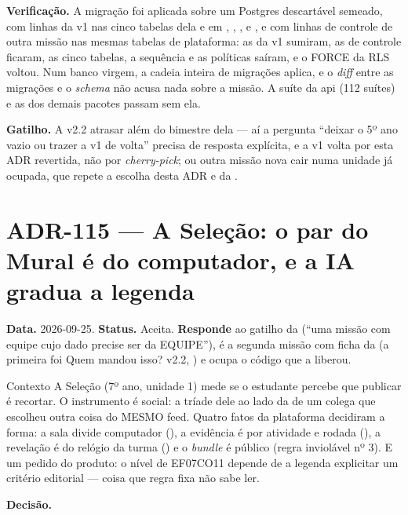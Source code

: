 \textbf{Verificação.} A migração foi aplicada sobre um Postgres descartável
semeado, com linhas da v1 nas cinco tabelas dela e em ,
, ,  e
, e com linhas de controle de outra missão nas mesmas
tabelas de plataforma: as da v1 sumiram, as de controle ficaram, as cinco
tabelas, a sequência e as políticas saíram, e o FORCE da RLS voltou. Num banco
virgem, a cadeia inteira de migrações aplica, e o \emph{diff} entre as migrações
e o \emph{schema} não acusa nada sobre a missão. A suíte da api (112 suítes) e as
dos demais pacotes passam sem ela.

\textbf{Gatilho.} A v2.2 atrasar além do bimestre dela --- aí a pergunta
\enquote{deixar o 5º ano vazio ou trazer a v1 de volta} precisa de resposta
explícita, e a v1 volta por esta ADR revertida, não por \emph{cherry-pick}; ou
outra missão nova cair numa unidade já ocupada, que repete a escolha desta ADR
e da .

\section{ADR-115 --- A Seleção: o par do Mural é do computador, e a IA gradua a legenda}
\label{adr:a-selecao}

\textbf{Data.} 2026-09-25. \textbf{Status.} Aceita.
\textbf{Responde} ao gatilho da  (\enquote{uma missão com equipe
cujo dado precise ser da EQUIPE}), é a segunda missão com ficha da
 (a primeira foi Quem mandou isso? v2.2, ) e ocupa
o código que a  liberou.

\begin{especificacao}{Contexto}
A Seleção (7º ano, unidade 1) mede se o estudante percebe que publicar é
recortar. O instrumento é social: a tríade dele ao lado da de um colega que
escolheu outra coisa do MESMO feed. Quatro fatos da plataforma decidiram a forma:
a sala divide computador (), a evidência é por atividade e rodada
(), a revelação é do relógio da turma () e o
\emph{bundle} é público (regra inviolável nº 3). E um pedido do produto: o nível
de EF07CO11 depende de a legenda explicitar um critério editorial --- coisa que
regra fixa não sabe ler.
\end{especificacao}

\textbf{Decisão.}

